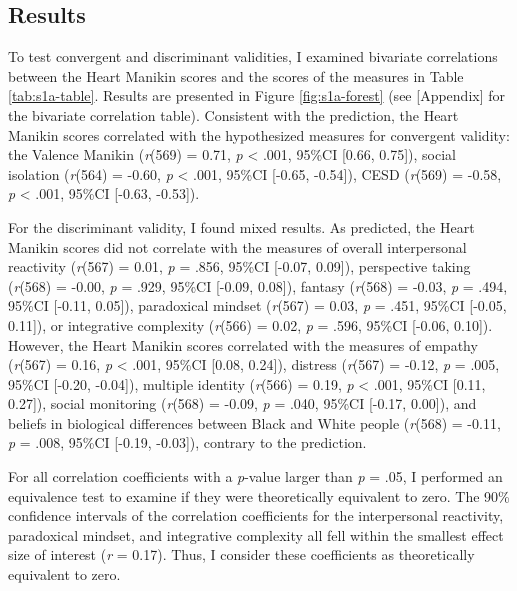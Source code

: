 \documentclass[
]{udthesis}
\begin{document}
\subsection{Results}\label{results}

To test convergent and discriminant validities, I examined bivariate
correlations between the Heart Manikin scores and the scores of the
measures in Table \ref{tab:s1a-table}. Results are presented in Figure
\ref{fig:s1a-forest} (see {[}Appendix{]} for the bivariate correlation
table). Consistent with the prediction, the Heart Manikin scores
correlated with the hypothesized measures for convergent validity: the
Valence Manikin (\emph{r}(569) = 0.71, \emph{p} \textless{} .001, 95\%CI {[}0.66, 0.75{]}), social isolation
(\emph{r}(564) = -0.60, \emph{p} \textless{} .001, 95\%CI {[}-0.65, -0.54{]}), CESD (\emph{r}(569) = -0.58, \emph{p} \textless{} .001, 95\%CI {[}-0.63, -0.53{]}).

For the discriminant validity, I found mixed results. As predicted, the
Heart Manikin scores did not correlate with the measures of overall
interpersonal reactivity (\emph{r}(567) = 0.01, \emph{p} = .856, 95\%CI {[}-0.07, 0.09{]}), perspective taking (\emph{r}(568) = -0.00, \emph{p} = .929, 95\%CI {[}-0.09, 0.08{]}), fantasy (\emph{r}(568) = -0.03, \emph{p} = .494, 95\%CI {[}-0.11, 0.05{]}), paradoxical mindset
(\emph{r}(567) = 0.03, \emph{p} = .451, 95\%CI {[}-0.05, 0.11{]}), or integrative complexity
(\emph{r}(566) = 0.02, \emph{p} = .596, 95\%CI {[}-0.06, 0.10{]}). However, the Heart Manikin scores correlated
with the measures of empathy (\emph{r}(567) = 0.16, \emph{p} \textless{} .001, 95\%CI {[}0.08, 0.24{]}), distress (\emph{r}(567) = -0.12, \emph{p} = .005, 95\%CI {[}-0.20, -0.04{]}), multiple identity
(\emph{r}(566) = 0.19, \emph{p} \textless{} .001, 95\%CI {[}0.11, 0.27{]}), social monitoring
(\emph{r}(568) = -0.09, \emph{p} = .040, 95\%CI {[}-0.17, 0.00{]}), and beliefs in biological differences between
Black and White people (\emph{r}(568) = -0.11, \emph{p} = .008, 95\%CI {[}-0.19, -0.03{]}), contrary to
the prediction.

For all correlation coefficients with a \emph{p}-value larger than \emph{p} = .05, I
performed an equivalence test to examine if they were theoretically
equivalent to zero. The 90\% confidence intervals of the correlation
coefficients for the interpersonal reactivity, paradoxical mindset, and
integrative complexity all fell within the smallest effect size of
interest (\textbar{}\emph{r}\textbar{} = 0.17). Thus, I consider these coefficients as
theoretically equivalent to zero.
\end{document}
